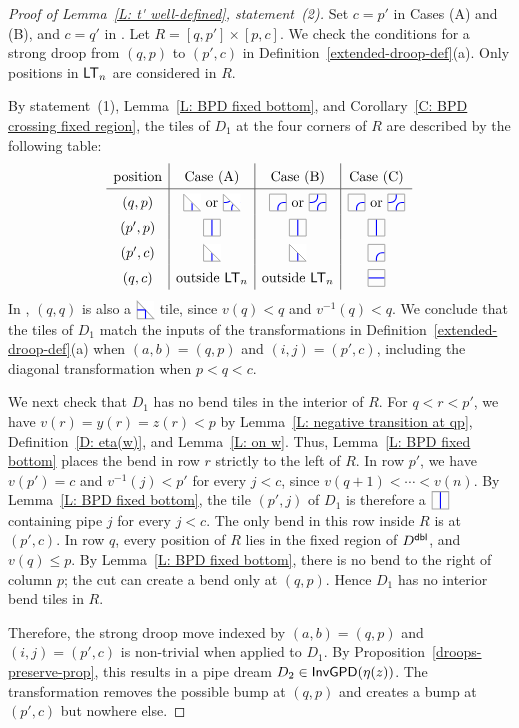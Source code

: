 \documentclass[10pt]{article}
\begin{document}
\begin{proof}[Proof of Lemma~\ref{L: t' well-defined}, statement~(2)]
Set $c=p'$ in Cases (A) and (B), and $c=q'$ in \CaseC.
Let $R=[q,p']\times[p,c]$.
We check the conditions for a strong droop from $(q,p)$ to $(p',c)$
in Definition~\ref{extended-droop-def}(a).
Only positions in $\mathsf{LT}_n$ are considered in $R$.

By statement~(1), Lemma~\ref{L: BPD fixed bottom},
and Corollary~\ref{C: BPD crossing fixed region},
the tiles of $D_1$ at the four corners of $R$ are described by the following table:
\[
\begingroup
\renewcommand{\arraystretch}{1.5}
\begin{array}{c|c|c|c}
\text{position} & \text{\CaseA} & \text{\CaseB} & \text{\CaseC} \\
\hline
(q,p) & \CDIAG\text{ or }\EDIAG
& \CTILE\text{ or }\ETILE
& \CTILE\text{ or }\ETILE \\
(p',p) & \VTILE & \VTILE & \VTILE \\
(p',c) & \CDIAG & \CDIAG & \CTILE \\
(q,c) & \text{outside }\LT_n
& \text{outside }\LT_n & \HTILE
\end{array}
\endgroup
\]
In \CaseB, $(q,q)$ is also a $\PDIAG$ tile, since
$v(q)<q$ and $v^{-1}(q)<q$.
We conclude that the tiles of $D_1$ match the inputs of the transformations in
Definition~\ref{extended-droop-def}(a) when $(a,b) =(q,p)$ and $(i,j) = (p',c)$, including the diagonal
transformation when $p<q<c$.

We next check that $D_1$ has no bend tiles in the interior of $R$.
For $q<r<p'$, we have $v(r)=y(r)=z(r)<p$ by
Lemma~\ref{L: negative transition at qp}, Definition~\ref{D: eta(w)},
and Lemma~\ref{L: on w}.
Thus, Lemma~\ref{L: BPD fixed bottom} places the bend in row $r$
strictly to the left of $R$.
In row $p'$, we have $v(p')=c$ and $v^{-1}(j)<p'$ for every $j<c$,
since $v(q+1)<\cdots<v(n)$.
By Lemma~\ref{L: BPD fixed bottom}, the tile $(p',j)$ of $D_1$
is therefore a $\VTILE$ containing pipe $j$ for every $j<c$.
The only bend in this row inside $R$ is at $(p',c)$.
In row $q$, every position of $R$ lies in the fixed region of $D^{\mathsf{dbl}}$,
and $v(q)\leq p$.
By Lemma~\ref{L: BPD fixed bottom}, there is no bend to the right
of column $p$; the cut can create a bend only at $(q,p)$.
Hence $D_1$ has no interior bend tiles in $R$.

Therefore, the strong droop move indexed by $(a,b) =(q,p)$ and $(i,j) = (p',c)$ is non-trivial
when applied to $D_1$.
By Proposition~\ref{droops-preserve-prop},
this results in a pipe dream $D_2\in\mathsf{InvGPD}(\eta(z))$.
The transformation removes the possible bump at $(q,p)$
and creates a bump at $(p',c)$ but nowhere else.
\end{proof}
\end{document}
